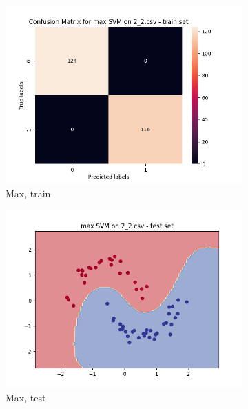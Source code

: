 \documentclass[12pt]{article}
\newcommand*{\subfigwidth}{0.24\textwidth}
\begin{document}
\begin{figure}[H]
\begin{subfigure}[t]{\subfigwidth}
        \includegraphics[width=\linewidth]{img/exp_2/svm/2_2/max/train_matrix.png}
        \caption{Max, train}
    \end{subfigure}
    \hfill
    \begin{subfigure}[t]{\subfigwidth}
        \includegraphics[width=\linewidth]{img/exp_2/svm/2_2/max/test_boundary.png}
        \caption{Max, test}
    \end{subfigure}
    \hfill
    \begin{subfigure}[t]{\subfigwidth}

\end{subfigure}
\end{figure}
\end{document}
